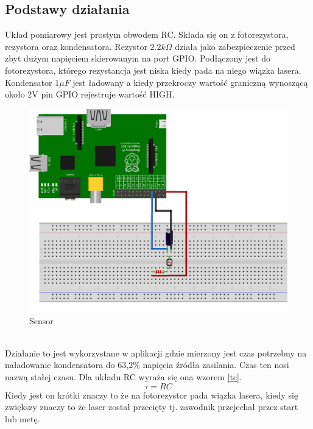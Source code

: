 \documentclass[11pt,a4paper, twoside]{article}
\begin{document}
\subsection{Podstawy działania}\label{sensor}
Układ pomiarowy jest prostym obwodem RC. Składa się on z fotorezystora, rezystora oraz kondensatora. Rezystor $2.2k \Omega$ działa jako zabezpieczenie przed zbyt dużym napięciem skierowanym na port GPIO. Podłączony jest do fotorezystora, którego rezystancja jest niska kiedy pada na niego wiązka lasera. Kondensator $1\mu F$ jest ładowany a kiedy przekroczy wartość graniczną wynoszącą około 2V pin GPIO rejestruje wartość HIGH.
\begin{figure}[h]
\begin{center}
\includegraphics[scale=0.15]{./img/sensor_bb.png}
\caption{Sensor}
\end{center}
\end{figure}
\\
Działanie to jest wykorzystane w aplikacji gdzie mierzony jest czas potrzebny na naładowanie kondensatora do 63,2\% napięcia źródła zasilania. Czas ten nosi nazwą stałej czasu. Dla układu RC wyraża się ona wzorem \ref{tc}. 
\begin{equation}\label{tc}
	\tau = RC
\end{equation}
Kiedy jest on krótki znaczy to że na fotorezystor pada wiązka lasera, kiedy się zwiększy znaczy to że laser został przecięty tj. zawodnik przejechał przez start lub metę. 
\newpage
\end{document}
